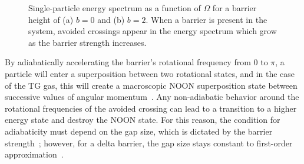 \begin{figure}

 \centering

\caption{Single-particle energy spectrum as a function of $\Omega$ for a barrier height of (a) $b = 0$ and (b) $b=2$.
When a barrier is present in the system, avoided crossings appear in the energy spectrum which grow as the barrier strength increases.}
\label{fig:avoid}
\end{figure}

By adiabatically accelerating the barrier's rotational frequency from 0 to $\pi$, a particle will enter a superposition between two rotational states, and in the case of the TG gas, this will create a macroscopic NOON superposition state between successive values of angular momentum~\cite{hallwood2010}.
Any non-adiabatic behavior around the rotational frequencies of the avoided crossing can lead to a transition to a higher energy state and destroy the NOON state.
For this reason, the condition for adiabaticity must depend on the gap size, which is dictated by the barrier strength~\cite{nunnenkamp2008}; however, for a delta barrier, the gap size stays constant to first-order approximation~\cite{hallwood2007}.

